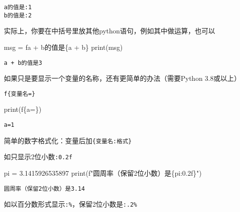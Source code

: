 \documentclass[
  letterpaper,
  DIV=11,
  numbers=noendperiod]{scrreprt}
\newenvironment{Shaded}{\begin{snugshade}}{\end{snugshade}}
\newcommand{\BuiltInTok}[1]{\textcolor[rgb]{0.00,0.23,0.31}{#1}}
\newcommand{\FloatTok}[1]{\textcolor[rgb]{0.68,0.00,0.00}{#1}}
\newcommand{\NormalTok}[1]{\textcolor[rgb]{0.00,0.23,0.31}{#1}}
\newcommand{\OperatorTok}[1]{\textcolor[rgb]{0.37,0.37,0.37}{#1}}
\newcommand{\SpecialCharTok}[1]{\textcolor[rgb]{0.37,0.37,0.37}{#1}}
\newcommand{\SpecialStringTok}[1]{\textcolor[rgb]{0.13,0.47,0.30}{#1}}
\begin{document}
\begin{verbatim}
a的值是:1
b的值是:2
\end{verbatim}

实际上，你要在中括号里放其他python语句，例如其中做运算，也可以

\begin{Shaded}
\begin{Highlighting}[]
\NormalTok{msg }\OperatorTok{=} \SpecialStringTok{f\textquotesingle{}a + b的值是}\SpecialCharTok{\{}\NormalTok{a }\OperatorTok{+}\NormalTok{ b}\SpecialCharTok{\}}\SpecialStringTok{\textquotesingle{}}
\BuiltInTok{print}\NormalTok{(msg)}
\end{Highlighting}
\end{Shaded}

\begin{verbatim}
a + b的值是3
\end{verbatim}

如果只是要显示一个变量的名称，还有更简单的办法（需要Python 3.8或以上）

\texttt{f\{变量名=\}}

\begin{Shaded}
\begin{Highlighting}[]
\BuiltInTok{print}\NormalTok{(}\SpecialStringTok{f\textquotesingle{}}\SpecialCharTok{\{}\NormalTok{a}\OperatorTok{=}\SpecialCharTok{\}}\SpecialStringTok{\textquotesingle{}}\NormalTok{)}
\end{Highlighting}
\end{Shaded}

\begin{verbatim}
a=1
\end{verbatim}

简单的数字格式化：变量后加\texttt{\{变量名:格式\}}

如只显示2位小数\texttt{:0.2f}

\begin{Shaded}
\begin{Highlighting}[]
\NormalTok{pi }\OperatorTok{=} \FloatTok{3.1415926535897}
\BuiltInTok{print}\NormalTok{(}\SpecialStringTok{f"圆周率（保留2位小数）是}\SpecialCharTok{\{}\NormalTok{pi}\SpecialCharTok{:0.2f\}}\SpecialStringTok{"}\NormalTok{)}
\end{Highlighting}
\end{Shaded}

\begin{verbatim}
圆周率（保留2位小数）是3.14
\end{verbatim}

如以百分数形式显示\texttt{:\%}，保留2位小数是\texttt{:.2\%}
\end{document}
